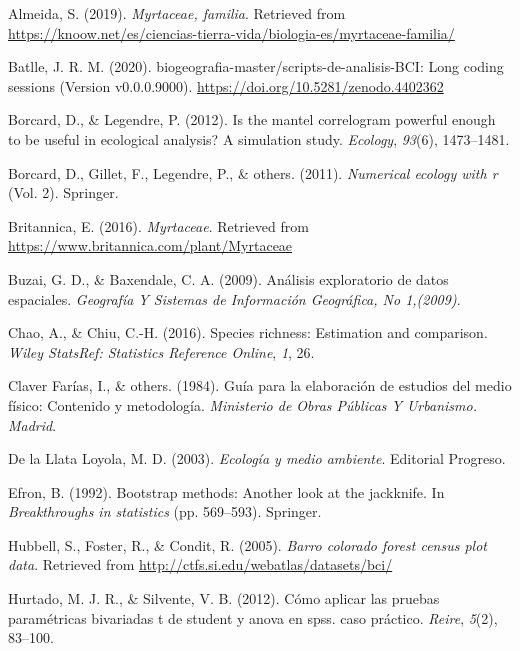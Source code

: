 \documentclass[11pt,]{article}
\begin{document}
\hypertarget{refs}{}
\hypertarget{ref-sandra2019myrtaceae}{}
Almeida, S. (2019). \emph{Myrtaceae, familia}. Retrieved from
\url{https://knoow.net/es/ciencias-tierra-vida/biologia-es/myrtaceae-familia/}

\hypertarget{ref-jose_ramon_martinez_batlle_2020_4402362}{}
Batlle, J. R. M. (2020). biogeografia-master/scripts-de-analisis-BCI:
Long coding sessions (Version v0.0.0.9000).
\url{https://doi.org/10.5281/zenodo.4402362}

\hypertarget{ref-borcard2012mantel}{}
Borcard, D., \& Legendre, P. (2012). Is the mantel correlogram powerful
enough to be useful in ecological analysis? A simulation study.
\emph{Ecology}, \emph{93}(6), 1473--1481.

\hypertarget{ref-borcard2011numerical}{}
Borcard, D., Gillet, F., Legendre, P., \& others. (2011).
\emph{Numerical ecology with r} (Vol. 2). Springer.

\hypertarget{ref-encymyrtaceae}{}
Britannica, E. (2016). \emph{Myrtaceae}. Retrieved from
\url{https://www.britannica.com/plant/Myrtaceae}

\hypertarget{ref-buzai2009analisis}{}
Buzai, G. D., \& Baxendale, C. A. (2009). Análisis exploratorio de datos
espaciales. \emph{Geografía Y Sistemas de Información Geográfica, No
1,(2009)}.

\hypertarget{ref-chao2016species}{}
Chao, A., \& Chiu, C.-H. (2016). Species richness: Estimation and
comparison. \emph{Wiley StatsRef: Statistics Reference Online},
\emph{1}, 26.

\hypertarget{ref-claver1984guia}{}
Claver Farías, I., \& others. (1984). Guía para la elaboración de
estudios del medio físico: Contenido y metodología. \emph{Ministerio de
Obras Públicas Y Urbanismo. Madrid}.

\hypertarget{ref-de2003ecologia}{}
De la Llata Loyola, M. D. (2003). \emph{Ecología y medio ambiente}.
Editorial Progreso.

\hypertarget{ref-efron1992bootstrap}{}
Efron, B. (1992). Bootstrap methods: Another look at the jackknife. In
\emph{Breakthroughs in statistics} (pp. 569--593). Springer.

\hypertarget{ref-Hubbell2005barro}{}
Hubbell, S., Foster, R., \& Condit, R. (2005). \emph{Barro colorado
forest census plot data}. Retrieved from
\url{http://ctfs.si.edu/webatlas/datasets/bci/}

\hypertarget{ref-hurtado2012como}{}
Hurtado, M. J. R., \& Silvente, V. B. (2012). Cómo aplicar las pruebas
paramétricas bivariadas t de student y anova en spss. caso práctico.
\emph{Reire}, \emph{5}(2), 83--100.
\end{document}

